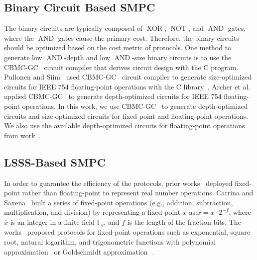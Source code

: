 \subsection{Binary Circuit Based SMPC}
\label{subsec:BinaryCircuitBasedSMPC}

The binary circuits are typically composed of $\operatorname{XOR}$, $\operatorname{NOT}$, and $\operatorname{AND}$ gates, where the $\operatorname{AND}$ gates cause the primary cost. Therefore, the binary circuits should be optimized based on the cost metric of \smpc protocols. One method to generate low $\operatorname{AND}$-depth and low $\operatorname{AND}$-size binary circuits is to use the CBMC-GC~\cite{buscher2016compiling} circuit compiler that derives circuit design with the C program. Pullonen and Siim~\cite{pullonen2015combining} used CBMC-GC~\cite{buscher2016compiling} circuit compiler to generate size-optimized circuits for IEEE 754 floating-point operations with the C library~\cite{BerkelySoftFloat,musllibc}. Archer et al.~\cite{archer2021cost} applied CBMC-GC~\cite{buscher2016compiling} to generate depth-optimized circuits for IEEE 754 floating-point operations. In this work, we use CBMC-GC~\cite{archer2021cost} to generate depth-optimized circuits and size-optimized circuits for fixed-point and floating-point operations. We also use the available depth-optimized circuits for floating-point operations from work~\cite{demmler2015aby}.

\subsection{LSSS-Based SMPC}
\label{subsec:LSSS-BasedSMPC}
In order to guarantee the efficiency of the \smpc protocols, prior works~\cite{catrina2010secure,liedel2012secure,hemenway2016high,aly2019benchmarking,lu2020faster} deployed fixed-point rather than floating-point to represent real number operations.
Catrina and Saxena~\cite{catrina2010secure} built a series of fixed-point operations (e.g., addition, subtraction, multiplication, and division) by representing a fixed-point $x$ as:$x = \overline{x}\cdot  2^{-f}$, where $\overline{x}$ is an integer in a finite field $\mathbb{F} _q$, and $f$ is the length of the fraction bits.
The works~\cite{liedel2012secure,hemenway2016high,aly2019benchmarking,lu2020faster} proposed protocols for fixed-point operations such as exponential, square root, natural logarithm, and trigonometric functions with polynomial approximation~\cite{hart1978computer} or Goldschmidt approximation~\cite{markstein2004software}.

